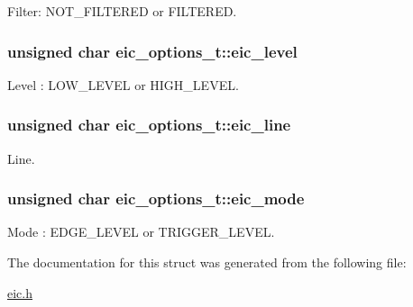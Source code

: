 \-Filter\-: \-N\-O\-T\-\_\-\-F\-I\-L\-T\-E\-R\-E\-D or \-F\-I\-L\-T\-E\-R\-E\-D. 

\hypertarget{structeic__options__t_a15dc1e2b4f9aeb2f662553d63505ef6a}{
\subsubsection[{eic\-\_\-level}]{\setlength{\rightskip}{0pt plus 5cm}unsigned char {\bf eic\-\_\-options\-\_\-t\-::eic\-\_\-level}}}
\label{structeic__options__t_a15dc1e2b4f9aeb2f662553d63505ef6a}


\-Level \-: \-L\-O\-W\-\_\-\-L\-E\-V\-E\-L or \-H\-I\-G\-H\-\_\-\-L\-E\-V\-E\-L. 

\hypertarget{structeic__options__t_a90385bc0fbbea5039957b28b216a85f3}{
\subsubsection[{eic\-\_\-line}]{\setlength{\rightskip}{0pt plus 5cm}unsigned char {\bf eic\-\_\-options\-\_\-t\-::eic\-\_\-line}}}
\label{structeic__options__t_a90385bc0fbbea5039957b28b216a85f3}


\-Line. 

\hypertarget{structeic__options__t_a82ae9d14d7e7b364542fb4b837a2c8de}{
\subsubsection[{eic\-\_\-mode}]{\setlength{\rightskip}{0pt plus 5cm}unsigned char {\bf eic\-\_\-options\-\_\-t\-::eic\-\_\-mode}}}
\label{structeic__options__t_a82ae9d14d7e7b364542fb4b837a2c8de}


\-Mode \-: \-E\-D\-G\-E\-\_\-\-L\-E\-V\-E\-L or \-T\-R\-I\-G\-G\-E\-R\-\_\-\-L\-E\-V\-E\-L. 



\-The documentation for this struct was generated from the following file\-:\begin{DoxyCompactItemize}
\item 
\hyperlink{eic_8h}{eic.\-h}\end{DoxyCompactItemize}
